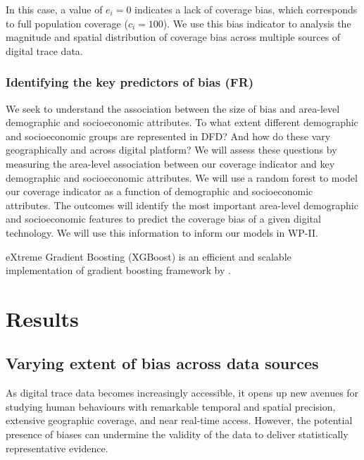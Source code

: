 \documentclass[]{rsos}%
\begin{document}
In this case, a value of \(e_i = 0\) indicates a lack of coverage bias,
which corresponds to full population coverage (\(c_i = 100\)). We use this
bias indicator to analysis the magnitude and spatial distribution of
coverage bias across multiple sources of digital trace data.

\hypertarget{identifying-the-key-predictors-of-bias-fr}{%
\subsubsection{Identifying the key predictors of bias (FR)}\label{identifying-the-key-predictors-of-bias-fr}}

We seek to understand the association between the size of bias and
area-level demographic and socioeconomic attributes. To what extent
different demographic and socioeconomic groups are represented in DFD?
And how do these vary geographically and across digital platform? We
will assess these questions by measuring the area-level association
between our coverage indicator and key demographic and socioeconomic
attributes. We will use a random forest to model our coverage indicator
as a function of demographic and socioeconomic attributes. The outcomes
will identify the most important area-level demographic and
socioeconomic features to predict the coverage bias of a given digital
technology. We will use this information to inform our models in WP-II.

eXtreme Gradient Boosting (XGBoost) is an efficient and scalable
implementation of gradient boosting framework by \citep{friedman2001, friedman2000}.

\hypertarget{results}{%
\section{Results}\label{results}}

\hypertarget{varying-extent-of-bias-across-data-sources}{%
\subsection{Varying extent of bias across data sources}\label{varying-extent-of-bias-across-data-sources}}

As digital trace data becomes increasingly accessible, it opens up new
avenues for studying human behaviours with remarkable temporal and
spatial precision, extensive geographic coverage, and near real-time
access. However, the potential presence of biases can undermine the
validity of the data to deliver statistically representative evidence.
\end{document}
